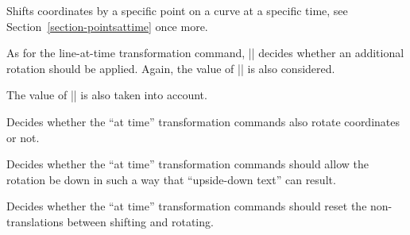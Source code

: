 \begin{command}{\pgftransformcurveattime{}}
  Shifts coordinates by a specific point on a curve at a specific
  time, see  Section~\ref{section-pointsattime} once more.

  As for the line-at-time transformation command, |\ifpgfslopedattime|
  decides whether an additional rotation should be applied. Again, the
  value of |\ifpgfallowupsidedowattime| is also considered. 
\begin{codeexample}[]
\end{codeexample}
\begin{codeexample}[]
\end{codeexample}
  The value of |\ifpgfresetnontranslationsattime| is also taken into account.
\end{command}


{
  \let\ifpgfslopedattime=\relax
  \begin{textoken}{\ifpgfslopedattime}
    Decides whether the ``at time'' transformation commands also
    rotate coordinates or not.
  \end{textoken}
}
{
  \let\ifpgfallowupsidedowattime=\relax
  \begin{textoken}{\ifpgfallowupsidedowattime}
    Decides whether the ``at time'' transformation commands should
    allow the rotation be down in such a way that ``upside-down text''
    can result.
  \end{textoken}
}
{
  \let\ifpgfresetnontranslationsattime=\relax
  \begin{textoken}{\ifpgfresetnontranslationsattime}
    Decides whether the ``at time'' transformation commands should
    reset the non-translations between shifting and rotating.
  \end{textoken}
}


